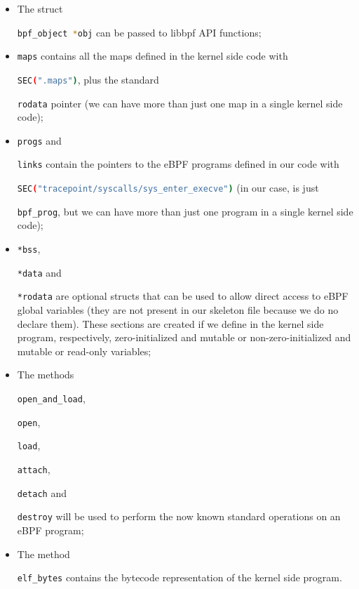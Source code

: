 \begin{itemize}
	\item 
		The struct \raggedright\colorbox{backcolour}{\lstinline[style=commandline, language=bash]|bpf_object *obj|} can be passed to libbpf API functions;
	\item 
		\raggedright\colorbox{backcolour}{\lstinline[style=commandline, language=bash]|maps|} contains all the maps defined in the kernel side code with \raggedright\colorbox{backcolour}{\lstinline[style=commandline, language=bash]|SEC(".maps")|}, plus the standard \raggedright\colorbox{backcolour}{\lstinline[style=commandline, language=bash]|rodata|} pointer (we can have more than just one map in a single kernel side code);
	\item 
		\raggedright\colorbox{backcolour}{\lstinline[style=commandline, language=bash]|progs|} and \raggedright\colorbox{backcolour}{\lstinline[style=commandline, language=bash]|links|} contain the pointers to the eBPF programs defined in our code with \raggedright\colorbox{backcolour}{\lstinline[style=commandline, language=bash]|SEC("tracepoint/syscalls/sys_enter_execve")|} (in our case, is just \raggedright\colorbox{backcolour}{\lstinline[style=commandline, language=bash]|bpf_prog|}, but we can have more than just one program in a single kernel side code);
	\item 
		\raggedright\colorbox{backcolour}{\lstinline[style=commandline, language=bash]|*bss|}, \raggedright\colorbox{backcolour}{\lstinline[style=commandline, language=bash]|*data|} and \raggedright\colorbox{backcolour}{\lstinline[style=commandline, language=bash]|*rodata|} are optional structs that can be used to allow direct access to eBPF global variables (they are not present in our skeleton file because we do no declare them).
		These sections are created if we define in the kernel side program, respectively, zero-initialized and mutable or non-zero-initialized and mutable or read-only variables;
	\item 
		The methods \raggedright\colorbox{backcolour}{\lstinline[style=commandline, language=bash]|open_and_load|}, \raggedright\colorbox{backcolour}{\lstinline[style=commandline, language=bash]|open|}, \raggedright\colorbox{backcolour}{\lstinline[style=commandline, language=bash]|load|}, \raggedright\colorbox{backcolour}{\lstinline[style=commandline, language=bash]|attach|}, \raggedright\colorbox{backcolour}{\lstinline[style=commandline, language=bash]|detach|} and \raggedright\colorbox{backcolour}{\lstinline[style=commandline, language=bash]|destroy|} will be used to perform the now known standard operations on an eBPF program;
	\item 
		The method \raggedright\colorbox{backcolour}{\lstinline[style=commandline, language=bash]|elf_bytes|} contains the bytecode representation of the kernel side program.
\end{itemize}

